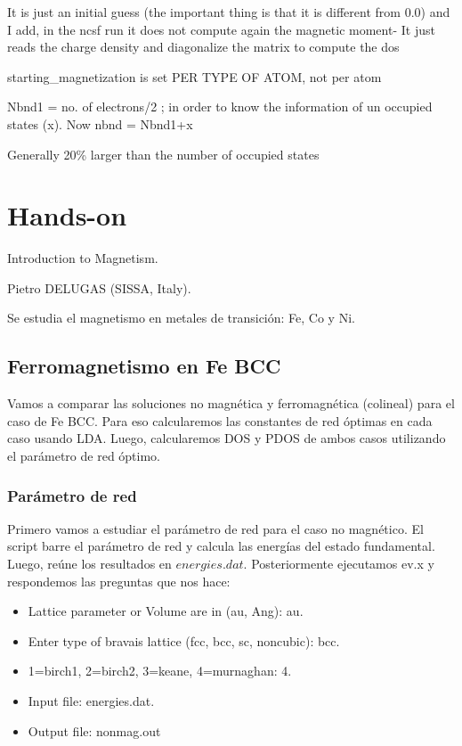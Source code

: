 
  It is just an initial guess (the important thing is that it is different from 0.0) and I add, in the ncsf run it does not compute again the magnetic moment- It just reads the charge  density and diagonalize the matrix to compute the dos


  starting\_magnetization is set PER TYPE OF ATOM, not per atom


  Nbnd1 = no. of electrons/2 ; in order to know the information of un occupied states (x). Now nbnd = Nbnd1+x

  Generally 20\% larger than the number of  occupied states

\section{Hands-on}

   Introduction to Magnetism.

  	Pietro DELUGAS (SISSA, Italy).

  Se estudia el magnetismo en metales de transición: Fe, Co y Ni.

\subsection{Ferromagnetismo en Fe BCC}

  Vamos a comparar las soluciones no magnética y ferromagnética (colineal) para el caso de Fe BCC. Para eso calcularemos las constantes de red óptimas en cada caso usando LDA. Luego, calcularemos DOS y PDOS de ambos casos utilizando el parámetro de red óptimo.

\subsubsection{Parámetro de red}

  Primero vamos a estudiar el parámetro de red para el caso no magnético. El script barre el parámetro de red y calcula las energías del estado fundamental. Luego, reúne los resultados en $energies.dat$. Posteriormente ejecutamos ev.x y respondemos las preguntas que nos hace:
    \begin{itemize}
      \item Lattice parameter or Volume are in (au, Ang): au.
      \item Enter type of bravais lattice (fcc, bcc, sc, noncubic): bcc.
      \item 1=birch1, 2=birch2, 3=keane, 4=murnaghan: 4.
      \item Input file: energies.dat.
      \item Output file: nonmag.out
    \end{itemize}

